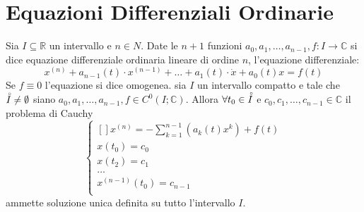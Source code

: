 \section{Equazioni Differenziali Ordinarie}
Sia $I\subseteq\mathbb{R}$ un intervallo e $n\in N$. Date le $n+1$ funzioni $a_0,a_1,\ldots,a_{n-1}, f:I\to\mathbb{C}$ si dice equazione differenziale ordinaria lineare di ordine $n$, l'equazione differenziale:
$$x^{(n)}+a_{n-1}(t)\cdot x^{(n-1)}+\ldots+a_1(t)\cdot\dot{x}+a_0(t)x=f(t)$$
Se $f\equiv 0 $ l'equazione si dice omogenea.
\proposition
sia $I$ un intervallo compatto e tale che $\accentset{\circ}{I}\ne \emptyset$ siano $a_0,a_1,\ldots,a_{n-1},f\in C^0(I;\mathbb{C})$. Allora $\forall t_0\in\accentset{\circ}{I}$ e $c_0,c_1,\ldots,c_{n-1}\in\mathbb{C}$ il problema di Cauchy 
$$ \left\{\begin{matrix}[]
x^{(n)}=-\sum\limits_{k=1}^{n-1}\left(a_k(t)x^k\right)+f(t)\\
x(t_0)=c_0\\
x(t_2)=c_1\\
\ldots\\
x^{(n-1)}(t_0)=c_{n-1}\\
\end{matrix}\right.$$
ammette soluzione unica definita su tutto l'intervallo $I$.
